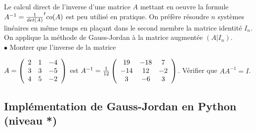 \documentclass[a4paper, 10pt]{article}
\begin{document}
Le calcul direct de l'inverse d'une matrice $A$ mettant en oeuvre la formule
$A^{-1}= {1 \over det(A)} ^tco(A)$ est peu utilisé en pratique. 
On préfère résoudre $n$ systèmes linéaires en même temps en plaçant dans le second membre
la matrice identité $I_n$. On applique la méthode de Gauss-Jordan à la matrice augmentée $(A| I_n)$.
\\

 $\bullet$ Montrer que l'inverse de la matrice 

$A=\left(
\begin{array}{c c c }
2  & 1   & -4  \\
3  & 3   & -5   \\
4  & 5  &  -2  \\ 
\end{array}
\right)$
est 
$A^{-1}= {1 \over 12} \left(
\begin{array}{c c c }
19  & -18   & 7  \\
-14  & 12   & -2   \\
3  & -6  &  3  \\ 
\end{array}
\right)$.
Vérifier que $A A^{-1}=I$.

\subsection{Implémentation de Gauss-Jordan en Python (niveau *)}
\end{document}
